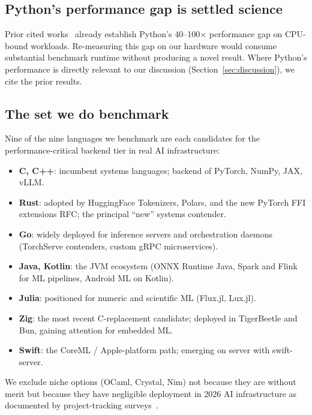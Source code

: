 \documentclass[10pt,conference]{IEEEtran}
\begin{document}
\subsection{Python's performance gap is settled science}

Prior cited works~\cite{bugden2022igscong,pereira2017energy,clbg}
already establish Python's 40--100$\times$ performance gap on
CPU-bound workloads. Re-measuring this gap on our hardware would
consume substantial benchmark runtime without producing a novel
result. Where Python's performance is directly relevant to our
discussion (Section~\ref{sec:discussion}), we cite the prior
results.

\subsection{The set we do benchmark}

Nine of the nine languages we benchmark are each candidates for the
performance-critical backend tier in real AI infrastructure:
\begin{itemize}
    \item \textbf{C, C++}: incumbent systems languages; backend of
          PyTorch, NumPy, JAX, vLLM.
    \item \textbf{Rust}: adopted by HuggingFace Tokenizers, Polars,
          and the new PyTorch FFI extensions RFC; the principal
          ``new'' systems contender.
    \item \textbf{Go}: widely deployed for inference servers and
          orchestration daemons (TorchServe contenders, custom gRPC
          microservices).
    \item \textbf{Java, Kotlin}: the JVM ecosystem (ONNX Runtime
          Java, Spark and Flink for ML pipelines, Android ML on
          Kotlin).
    \item \textbf{Julia}: positioned for numeric and scientific ML
          (Flux.jl, Lux.jl).
    \item \textbf{Zig}: the most recent C-replacement candidate;
          deployed in TigerBeetle and Bun, gaining attention for
          embedded ML.
    \item \textbf{Swift}: the CoreML / Apple-platform path; emerging
          on server with swift-server.
\end{itemize}


We exclude niche options (OCaml, Crystal, Nim)
not because they are without merit but because they have negligible
deployment in 2026 AI infrastructure as documented by project-tracking
surveys~\cite{stackoverflow2024survey}.
\end{document}
